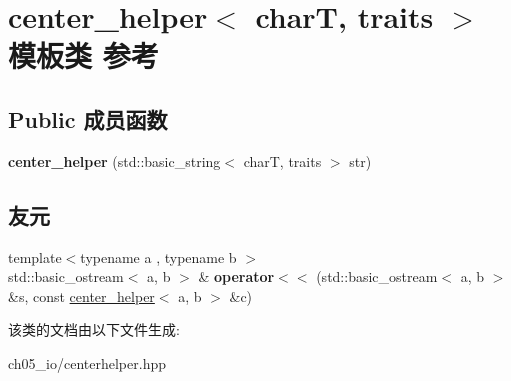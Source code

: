 \hypertarget{classcenter__helper}{}\section{center\+\_\+helper$<$ charT, traits $>$ 模板类 参考}
\label{classcenter__helper}
\subsection*{Public 成员函数}
\begin{DoxyCompactItemize}
\item 
\mbox{\label{classcenter__helper_aac138294330e9dcc9315669a388cafdc}} 
{\bfseries center\+\_\+helper} (std\+::basic\+\_\+string$<$ charT, traits $>$ str)
\end{DoxyCompactItemize}
\subsection*{友元}
\begin{DoxyCompactItemize}
\item 
\mbox{\label{classcenter__helper_affc110ec33fda3c7ba2bd5edf344b598}} 
{\footnotesize template$<$typename a , typename b $>$ }\\std\+::basic\+\_\+ostream$<$ a, b $>$ \& {\bfseries operator$<$$<$} (std\+::basic\+\_\+ostream$<$ a, b $>$ \&s, const \mbox{\hyperlink{classcenter__helper}{center\+\_\+helper}}$<$ a, b $>$ \&c)
\end{DoxyCompactItemize}


该类的文档由以下文件生成\+:\begin{DoxyCompactItemize}
\item 
ch05\+\_\+io/centerhelper.\+hpp\end{DoxyCompactItemize}
